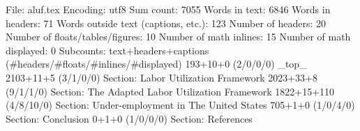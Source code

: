 File: aluf.tex
Encoding: utf8
Sum count: 7055
Words in text: 6846
Words in headers: 71
Words outside text (captions, etc.): 123
Number of headers: 20
Number of floats/tables/figures: 10
Number of math inlines: 15
Number of math displayed: 0
Subcounts:
  text+headers+captions (#headers/#floats/#inlines/#displayed)
  193+10+0 (2/0/0/0) _top_
  2103+11+5 (3/1/0/0) Section: Labor Utilization Framework
  2023+33+8 (9/1/1/0) Section: The Adapted Labor Utilization Framework
  1822+15+110 (4/8/10/0) Section: Under-employment in The United States
  705+1+0 (1/0/4/0) Section: Conclusion
  0+1+0 (1/0/0/0) Section: References

